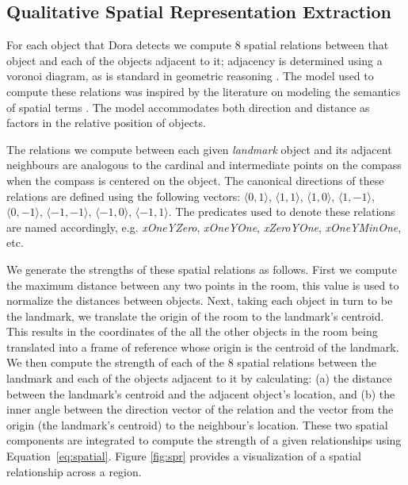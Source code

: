 \subsection{Qualitative Spatial Representation Extraction}

For each object that Dora detects we compute 8 spatial relations between that object and each of the objects adjacent to it; adjacency is determined using a voronoi diagram, as is standard in geometric reasoning \cite{Forbus/etal2003}. The model used to compute these relations was inspired by the literature on modeling the semantics of spatial terms \cite{kelleher/costello:09,kelleher/vanGenabith:2006,regier/carlson:2001,gapp:1994}. The model accommodates both direction and distance as factors in the relative position of objects. 

The relations we compute between each given \emph{landmark} object and its adjacent neighbours are analogous to the cardinal and intermediate points on the compass when the compass is centered on the object. The canonical directions of these relations are defined using the following vectors: $\langle0,1\rangle$, $\langle1,1\rangle$, $\langle1,0\rangle$, $\langle1,-1\rangle$, $\langle0,-1\rangle$, $\langle-1,-1\rangle$, $\langle-1,0\rangle$, $\langle-1,1\rangle$. The predicates used to denote these relations are named accordingly, e.g. \textit{xOneYZero}, \textit{xOneYOne}, \textit{xZeroYOne}, \textit{xOneYMinOne}, etc.

We generate the strengths of these spatial relations as follows. First we compute the maximum distance between any two points in the room, this value is used to normalize the distances between objects. Next, taking each object in turn to be the landmark, we translate the origin of the room to the landmark's centroid. This results in the coordinates of the all the other objects in the room being translated into a frame of reference whose origin is the centroid of the landmark.  We then compute the strength of each of the 8 spatial relations between the landmark and each of the objects adjacent to it by calculating: (a) the distance between the landmark's centroid and the adjacent object's location, and (b) the inner angle between the direction vector of the relation and the vector from the origin (the landmark's centroid) to the neighbour's location. These two spatial components are integrated to compute the strength of a given relationships using Equation~\ref{eq:spatial}. Figure \ref{fig:spr} provides a visualization of a spatial relationship across a region. 

